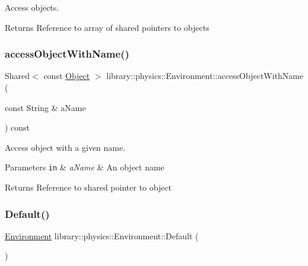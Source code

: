 Access objects. 

\begin{DoxyReturn}{Returns}
Reference to array of shared pointers to objects 
\end{DoxyReturn}
\mbox{\label{classlibrary_1_1physics_1_1_environment_adb18bd17dfbffa181d7e0d868c2647a0}} 
\subsubsection{\texorpdfstring{access\+Object\+With\+Name()}{accessObjectWithName()}}
{\footnotesize\ttfamily Shared$<$ const \hyperlink{classlibrary_1_1physics_1_1env_1_1_object}{Object} $>$ library\+::physics\+::\+Environment\+::access\+Object\+With\+Name (\begin{DoxyParamCaption}\item[{const String \&}]{a\+Name }\end{DoxyParamCaption}) const}



Access object with a given name. 


\begin{DoxyParams}[1]{Parameters}
\mbox{\tt in}  & {\em a\+Name} & An object name \\
\hline
\end{DoxyParams}
\begin{DoxyReturn}{Returns}
Reference to shared pointer to object 
\end{DoxyReturn}
\mbox{\label{classlibrary_1_1physics_1_1_environment_a7fcc57999bfb9c0c7e70b7cc783e30c8}} 
\subsubsection{\texorpdfstring{Default()}{Default()}}
{\footnotesize\ttfamily \hyperlink{classlibrary_1_1physics_1_1_environment}{Environment} library\+::physics\+::\+Environment\+::\+Default (\begin{DoxyParamCaption}{ }\end{DoxyParamCaption})\hspace{0.3cm}{\ttfamily [static]}}

